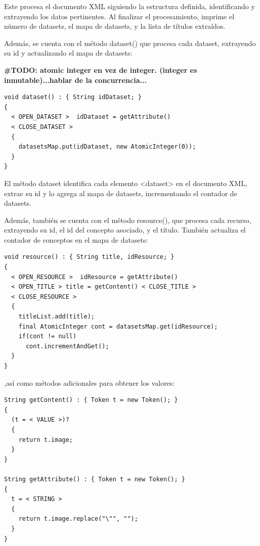 Este procesa el documento XML siguiendo la estructura definida, identificando y extrayendo los datos pertinentes. Al finalizar el procesamiento, imprime el número de datasets, el mapa de datasets, y la lista de títulos extraídos.

Además, se cuenta con el método dataset() que procesa cada dataset, extrayendo su id y actualizando el mapa de datasets:

\textbf{\#TODO: atomic integer en vez de integer. (integer es inmutable)...hablar de la concurrencia...}

\lstset{inputencoding=utf8/latin1}
\begin{lstlisting}
void dataset() : { String idDataset; } 
{
  < OPEN_DATASET >  idDataset = getAttribute() 
  < CLOSE_DATASET >
  {
    datasetsMap.put(idDataset, new AtomicInteger(0));
  }
}
\end{lstlisting}

El método dataset identifica cada elemento <dataset> en el documento XML, extrae su id y lo agrega al mapa de datasets, incrementando el contador de datasets.

Además, también se cuenta con el método resource(), que procesa cada recurso, extrayendo su id, el id del concepto asociado, y el título. También actualiza el contador de conceptos en el mapa de datasets:

\lstset{inputencoding=utf8/latin1}
\begin{lstlisting}
void resource() : { String title, idResource; } 
{
  < OPEN_RESOURCE >  idResource = getAttribute() 
  < OPEN_TITLE > title = getContent() < CLOSE_TITLE > 
  < CLOSE_RESOURCE >
  {
    titleList.add(title);
    final AtomicInteger cont = datasetsMap.get(idResource);
    if(cont != null)
      cont.incrementAndGet();
  }
}
\end{lstlisting}

,así como métodos adicionales para obtener los valores:

\lstset{inputencoding=utf8/latin1}
\begin{lstlisting}
String getContent() : { Token t = new Token(); }
{
  (t = < VALUE >)?
  {
    return t.image;
  } 
}

String getAttribute() : { Token t = new Token(); }
{
  t = < STRING > 
  {
    return t.image.replace("\"", "");
  } 
}
\end{lstlisting}



